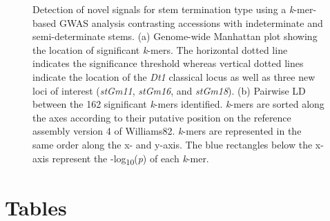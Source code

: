 \documentclass[doublespacing]{bmcart}
\begin{document}
\begin{backmatter}
\begin{figure}[p]
	\caption[Detection of novel signals for stem termination type
	using a \textit{k}-mer GWAS analysis contrasting accessions with
	indeterminate and semi-determinate stems]{Detection of novel signals for stem termination type
	using a \textit{k}-mer-based GWAS analysis contrasting accessions with
	indeterminate and semi-determinate stems.
	(a) Genome-wide Manhattan plot showing the location of significant \textit{k}-mers.
	The horizontal dotted line indicates the significance threshold
	whereas vertical dotted lines indicate the location of the \textit{Dt1}
	classical locus as well as three new loci of interest (\textit{stGm11},
	\textit{stGm16}, and \textit{stGm18}).
	(b) Pairwise LD between the 162 significant \textit{k}-mers identified.
	\textit{k}-mers are sorted along the axes according to their
	putative position on the reference assembly version 4 of Williams82.
	\textit{k}-mers are
	represented in the same order along the x- and y-axis. The blue
	rectangles below the x-axis represent the
	-log\textsubscript{10}(\textit{p}) of each \textit{k}-mer.}
	\label{stem-termination-main-figure}
\end{figure}



\section*{Tables}

\begin{table}[p]
	\caption[Performance of three GWAS approaches at detecting causal genes/variants]%
	{Performance of three GWAS approaches at detecting causal genes or variants at cloned loci.}
	\label{loci-table}


\end{table}
\end{backmatter}
\end{document}
